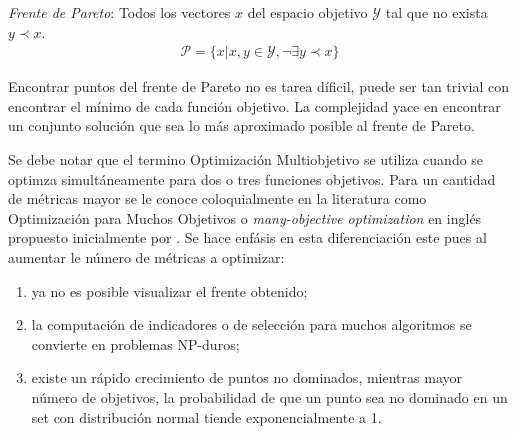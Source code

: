 \textit{Frente de Pareto}: Todos los vectores $x$ del espacio objetivo $\mathcal{Y}$ tal que no exista $y \prec x$.
\begin{align*}
    \mathcal{P} = \{x| x, y \in \mathcal{Y}, \neg \exists y \prec x \} 
\end{align*}

Encontrar puntos del frente de Pareto no es tarea d\'ificil, puede ser tan trivial con encontrar el m\'inimo de cada funci\'on objetivo. La complejidad yace en encontrar un conjunto soluci\'on que sea lo m\'as aproximado posible al frente de Pareto.

Se debe notar que el termino Optimizaci\'on Multiobjetivo se utiliza cuando se optimza simult\'aneamente para dos o tres funciones objetivos. Para un cantidad de m\'etricas mayor se le conoce coloquialmente en la literatura como Optimizaci\'on para Muchos Objetivos o \textit{many-objective optimization} en ingl\'es propuesto inicialmente por \cite{10.1007/978-3-540-31880-4_2}. Se hace enf\'asis en esta  diferenciaci\'on este pues al aumentar le n\'umero de m\'etricas a optimizar:
\begin{enumerate}
    \item ya no es posible visualizar el frente obtenido;
    \item la computaci\'on de indicadores o de selecci\'on para muchos algoritmos se convierte en problemas NP-duros;
    \item existe un r\'apido crecimiento de puntos no dominados, mientras mayor n\'umero de objetivos, la probabilidad de que un punto sea no dominado en un set con distribuci\'on normal tiende exponencialmente a 1.
\end{enumerate}



